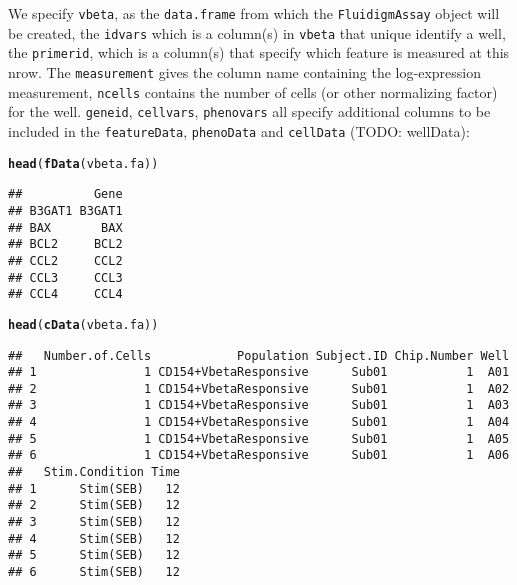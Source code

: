 \documentclass{article}\usepackage{graphicx, color}
\makeatletter
\newcommand{\hlfunctioncall}[1]{\textcolor[rgb]{0.501960784313725,0,0.329411764705882}{\textbf{#1}}}%
\newenvironment{kframe}{%
 \def\at@end@of@kframe{}%
 \ifinner\ifhmode%
  \def\at@end@of@kframe{\end{minipage}}%
  \begin{minipage}{\columnwidth}%
 \fi\fi%
 \def\FrameCommand##1{\hskip\@totalleftmargin \hskip-\fboxsep
 \colorbox{shadecolor}{##1}\hskip-\fboxsep
     \hskip-\linewidth \hskip-\@totalleftmargin \hskip\columnwidth}%
 \MakeFramed {\advance\hsize-\width
   \@totalleftmargin\z@ \linewidth\hsize
   \@setminipage}}%
 {\par\unskip\endMakeFramed%
 \at@end@of@kframe}
\newenvironment{knitrout}{}{} %
\newcommand{\future}[1]{TODO: {\color{gray} #1}}
\makeatother
\begin{document}
We specify \texttt{vbeta}, as the \texttt{data.frame} from which the \texttt{FluidigmAssay} object will be created, the \texttt{idvars} which is a column(s) in \texttt{vbeta} that unique identify a well, the \texttt{primerid}, which is a column(s) that specify which feature is measured at this nrow.
The \texttt{measurement} gives the column name containing the log-expression measurement, \texttt{ncells} contains the number of cells (or other normalizing factor) for the well.  \texttt{geneid}, \texttt{cellvars}, \texttt{phenovars} all specify additional columns to be included in the \texttt{featureData}, \texttt{phenoData}  and \texttt{cellData} (\future{wellData}):
\begin{knitrout}
\color{fgcolor}\begin{kframe}
\begin{alltt}
\hlfunctioncall{head}(\hlfunctioncall{fData}(vbeta.fa))
\end{alltt}
\begin{verbatim}
##          Gene
## B3GAT1 B3GAT1
## BAX       BAX
## BCL2     BCL2
## CCL2     CCL2
## CCL3     CCL3
## CCL4     CCL4
\end{verbatim}
\begin{alltt}
\hlfunctioncall{head}(\hlfunctioncall{cData}(vbeta.fa))
\end{alltt}
\begin{verbatim}
##   Number.of.Cells            Population Subject.ID Chip.Number Well
## 1               1 CD154+VbetaResponsive      Sub01           1  A01
## 2               1 CD154+VbetaResponsive      Sub01           1  A02
## 3               1 CD154+VbetaResponsive      Sub01           1  A03
## 4               1 CD154+VbetaResponsive      Sub01           1  A04
## 5               1 CD154+VbetaResponsive      Sub01           1  A05
## 6               1 CD154+VbetaResponsive      Sub01           1  A06
##   Stim.Condition Time
## 1      Stim(SEB)   12
## 2      Stim(SEB)   12
## 3      Stim(SEB)   12
## 4      Stim(SEB)   12
## 5      Stim(SEB)   12
## 6      Stim(SEB)   12
\end{verbatim}
\end{kframe}
\end{knitrout}
\end{document}
